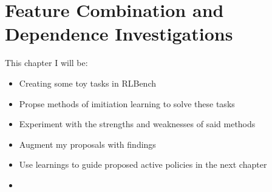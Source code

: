\chapter{Feature Combination and Dependence Investigations}
This chapter I will be:
\begin{itemize}
  \item Creating some toy tasks in RLBench
  \item Propse methods of imitiation learning to solve these tasks
  \item Experiment with the strengths and weaknesses of said methods
  \item Augment my proposals with findings
  \item Use learnings to guide proposed active policies in the next chapter 
  
  \item 
\end{itemize}








